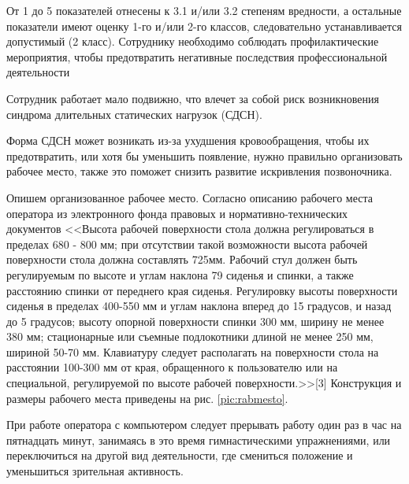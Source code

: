 От 1 до 5 показателей отнесены к 3.1 и/или 3.2 степеням вредности, а остальные показатели имеют оценку 1-го и/или 2-го классов, следовательно устанавливается допустимый (2 класс). Сотруднику необходимо соблюдать профилактические мероприятия, чтобы предотвратить негативные последствия профессиональной деятельности

Сотрудник работает мало подвижно, что влечет за собой риск возникновения синдрома длительных статических нагрузок (СДСН).

Форма СДСН может возникать из-за ухудшения кровообращения, чтобы их предотвратить, или хотя бы уменьшить появление, нужно правильно организовать рабочее место, также это поможет снизить развитие искривления позвоночника.

Опишем организованное рабочее место. Согласно описанию рабочего места оператора из электронного фонда правовых и нормативно-технических документов <<Высота рабочей поверхности стола должна регулироваться в пределах 680 - 800 мм; при отсутствии такой возможности высота рабочей поверхности стола должна составлять 725мм. Рабочий стул должен быть регулируемым по высоте и углам наклона 79 сиденья и спинки, а также расстоянию спинки от переднего края сиденья. Регулировку высоты поверхности сиденья в пределах 400-550 мм и углам наклона вперед до 15 градусов, и назад до 5 градусов; высоту опорной поверхности спинки 300 мм, ширину не менее 380 мм; стационарные или съемные подлокотники длиной не менее 250 мм, шириной 50-70 мм. Клавиатуру следует располагать на поверхности стола на расстоянии 100-300 мм от края, обращенного к пользователю или на специальной, регулируемой по высоте рабочей поверхности.>>[3] Конструкция и размеры рабочего места приведены на рис. \ref{pic:rabmesto}.


При работе оператора с компьютером следует прерывать работу один раз в час на пятнадцать минут, занимаясь в это время гимнастическими упражнениями, или переключиться на другой вид деятельности, где смениться положение и уменьшиться зрительная активность.

